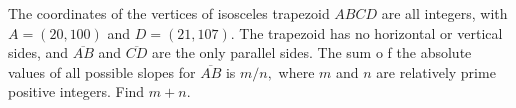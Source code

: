 The coordinates of the vertices of isosceles trapezoid $ABCD$ are all integers, with $A=(20,100)$ and $D=(21,107).$  The trapezoid has no horizontal or vertical sides, and $\overline{AB}$ and $\overline{CD}$ are the only parallel sides.  The sum o f the absolute values of all possible slopes for $\overline{AB}$ is $m/n,$ where $m$ and $n$ are relatively prime positive integers.  Find $m+n.$